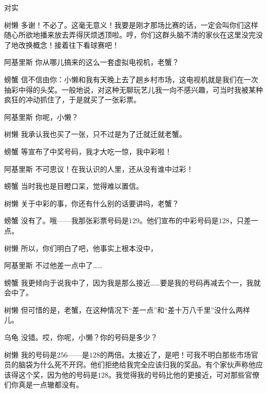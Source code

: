 \begin{dialog}{对实}
\begin{dialogue}
\item[树懒]多谢！不必了。这毫无意义！我要是刚才那场比赛的话，一定会叫你们这样随心所欲地播来放去弄得厌烦透顶啦。哼，你们这群头脑不清的家伙在这里没完没了地改换概念！接着往下看球赛吧！

\item[阿基里斯]你从哪儿搞来的这么一套虚拟电视机，老蟹？

\item[螃蟹]信不信由你：小懒和我有天晚上去了趟乡村市场，这电视机就是我们在一次抽彩中得的头奖。一般地说，对这种无聊玩艺儿我一向不感兴趣，可当时我被某种疯狂的冲动抓住了，于是就买了一张彩票。

\item[阿基里斯]你呢，小懒？

\item[树懒]我承认我也买了一张，只不过是为了迁就迁就老蟹。

\item[螃蟹]等宣布了中奖号码，我才大吃一惊，我中彩啦！

\item[阿基里斯]不可思议！在我认识的人里，还从没有谁中过彩！

\item[螃蟹]当时我也是目瞪口呆，觉得难以置信。

\item[树懒]关于中彩的事，你还有什么别的话要讲吗，老蟹？

\item[螃蟹]没有了。哦——我那张彩票号码是$129$。他们宣布的中彩号码是$128$，只差一点。

\item[树懒]所以，你们明白了吧，他事实上根本没中，

\item[阿基里斯]不过他差一点中了……

\item[螃蟹]我更倾向于说我中了，因为我是那么接近……要是我的号码再减去个一，我就会中了。

\item[树懒]但可惜的是，老蟹，在这种情况下“差一点”和“差十万八千里”没什么两样儿。

\item[乌龟]没错。哎，你呢，小懒？你的号码是多少？

\item[树懒]我的号码是$256$——是$128$的两倍。太接近了，是吧！可我不明白那些市场官员的脑袋为什么死不开窍。他们拒绝给我完全应该归我的奖品。有个家伙声称他应该得这个奖，因为他的号码是$128$。我觉得我的号码比他的更接近，可对那些官僚们你真是一点辙都没有。


\end{dialogue}
\end{dialog}
